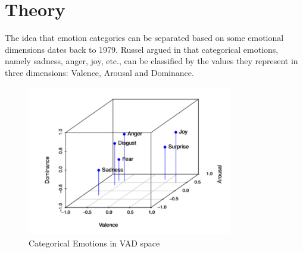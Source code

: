 \documentclass[a4paper,11pt]{article}
\begin{document}
\pagebreak

\section{Theory} \label{sec:theory}

The idea that emotion categories can be separated based on some emotional dimensions dates back to 1979. Russel argued in \cite{russell1979affective} that categorical emotions, namely sadness, anger, joy, etc., can be classified by the values they represent in three dimensions: Valence, Arousal and Dominance.

\begin{figure}[h]
\centering
\includegraphics[width=0.8\textwidth]{dimensions_pic.png}
\caption{Categorical Emotions in VAD space \cite{bualan2020emotion}}\label{fig:dimensions}
\end{figure}

\begin{table}[h]
\caption{\label{tab:vadtable}VAD Dimensions of 6 basic emotions \cite{bualan2020emotion}.}
\end{table}
\end{document}
